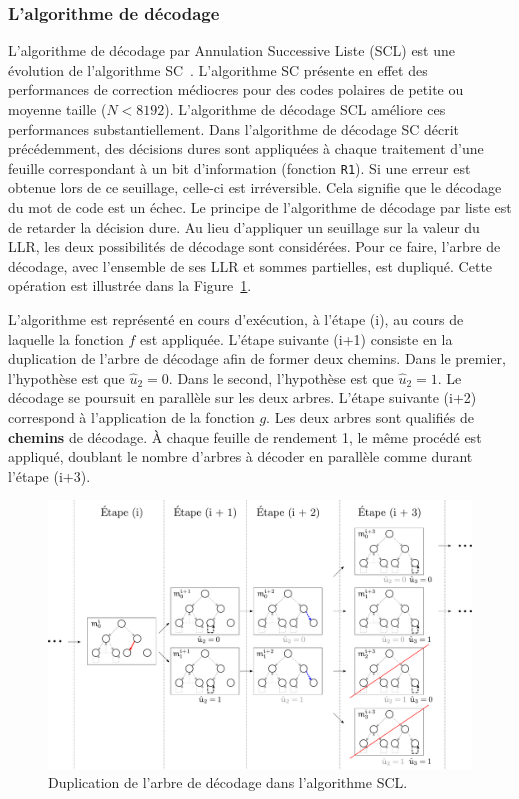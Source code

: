 \subsubsection{L'algorithme de décodage}
L'algorithme de décodage par Annulation Successive Liste (SCL) est une évolution de l'algorithme SC~\cite{tal_list_2011}. L'algorithme SC présente en effet des performances de correction médiocres pour des codes polaires de petite ou moyenne taille ($N < 8192$). L'algorithme de décodage SCL améliore ces performances substantiellement. Dans l'algorithme de décodage SC décrit précédemment, des décisions dures sont appliquées à chaque traitement d'une feuille correspondant à un bit d'information (fonction \texttt{R1}). Si une erreur est obtenue lors de ce seuillage, celle-ci est irréversible. Cela signifie que le décodage du mot de code est un échec. Le principe de l'algorithme de décodage par liste est de retarder la décision dure. Au lieu d'appliquer un seuillage sur la valeur du LLR, les deux possibilités de décodage sont considérées. Pour ce faire, l'arbre de décodage, avec l'ensemble de ses LLR et sommes partielles, est dupliqué. Cette opération est illustrée dans la Figure~\ref{fig:scl}.

L'algorithme est représenté en cours d'exécution, à l'étape (i), au cours de laquelle la fonction $f$ est appliquée. L'étape suivante (i+1) consiste en la duplication de l'arbre de décodage afin de former deux chemins. Dans le premier, l'hypothèse est que $\hat{u}_2=0$. Dans le second, l'hypothèse est que $\hat{u}_2=1$. Le décodage se poursuit en parallèle sur les deux arbres. L'étape suivante (i+2) correspond à l'application de la fonction $g$. Les deux arbres sont qualifiés de \textbf{chemins} de décodage. \`A chaque feuille de rendement 1, le même procédé est appliqué, doublant le nombre d'arbres à décoder en parallèle comme durant l'étape (i+3).

\begin{figure}[t]
\centering
\includegraphics[width=1\textwidth]{main/ch1_fig/scl}
\caption{Duplication de l'arbre de décodage dans l'algorithme SCL.}
\label{fig:scl}
\end{figure}

